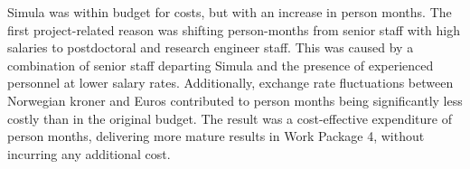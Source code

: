 Simula was within budget for costs, but with an increase in person months.
The first project-related reason was shifting person-months from senior staff with high salaries
to postdoctoral and research engineer staff.
This was caused by a combination of senior staff departing Simula
and the presence of experienced personnel at lower salary rates.
Additionally, exchange rate fluctuations between Norwegian kroner and Euros contributed
to person months being significantly less costly than in the original budget.
The result was a cost-effective expenditure of person months,
delivering more mature results in Work Package 4,
without incurring any additional cost.





